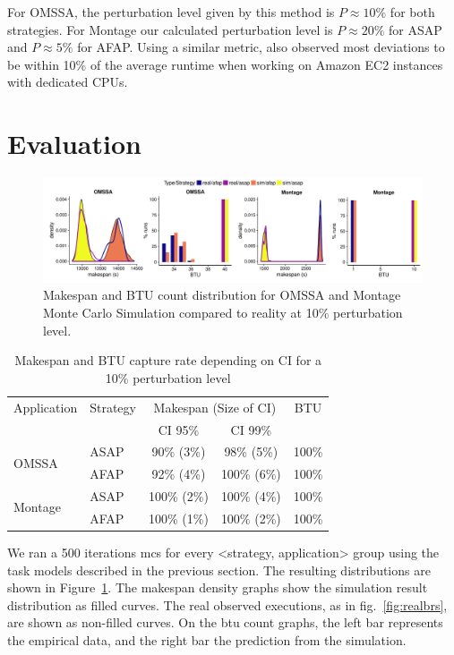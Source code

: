 \documentclass[]{llncs}
\begin{document}
For OMSSA, the perturbation level given by this method is $P\approx{}10\%$ for both
strategies. For Montage  our calculated perturbation level is  $P\approx{}20\%$
for ASAP and $P\approx{}5\%$ for AFAP. Using a similar metric, \cite{pics} also 
observed most deviations to be within 10\% of the average runtime when working on
Amazon EC2 instances with dedicated CPUs.

\section{Evaluation}
\label{sec:eval}
\begin{figure}
	\includegraphics[width=\textwidth]{gfx/fit_plot.pdf}
	\caption[caption]{Makespan and BTU count distribution for OMSSA and Montage Monte
	  Carlo Simulation compared to reality at 10\% perturbation level.%
	}
	\label{fig:fit}
\end{figure}
\begin{table}
	\centering
	\caption{Makespan and BTU capture rate depending on CI
          for a 10\% perturbation level}\label{tab:fit} 
	\begin{tabular}{llccc}
		\toprule
		Application&Strategy&\multicolumn{2}{c}{Makespan (Size of CI)}&BTU\\
                           &         & CI 95\% & CI 99\% &\\
		\midrule
		\multirow{2}{*}{OMSSA}&ASAP&  90\% (3\%)&  98\% (5\%)& 100\%\\
				      &AFAP&  92\% (4\%)& 100\% (6\%)& 100\%\\
		\midrule
		\multirow{2}{*}{Montage}&ASAP& 100\% (2\%)& 100\% (4\%)& 100\%\\
					&AFAP& 100\% (1\%)& 100\% (2\%)& 100\%\\
		\bottomrule
	\end{tabular}
\end{table}

We ran a 500 iterations \ac{mcs} for every <strategy, application> group using
the task models described in  the previous section. The  resulting distributions
are  shown  in  Figure~\ref{fig:fit}.   The makespan  density  graphs  show  the
simulation  result  distribution   as  filled  curves. The  real  observed
executions, as in  fig.~\ref{fig:realbrs}, are shown as  non-filled curves. On 
the \ac{btu} count graphs, the  left bar represents
the empirical data, and the right  bar the prediction from the simulation. 
\end{document}
